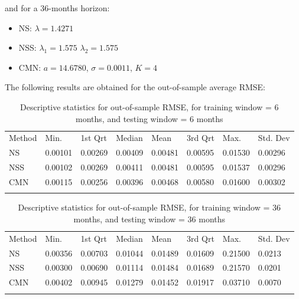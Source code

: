 and for a 36-months horizon: 
\begin{itemize}
\item NS: $\lambda = 1.4271$  
\item NSS: $\lambda_1 = 1.575$ $\lambda_2 = 1.575$
\item CMN: $a = 14.6780$, $\sigma = 0.0011$, $K = 4$
\end{itemize}

\medskip

The following results are obtained for the out-of-sample average RMSE: 

\begin{table}[!htb]
\begin{center}
\caption{Descriptive statistics for out-of-sample RMSE, for training window = 6 months, and testing window = 6 months}
\label{tab:freddatatables3}       %
\begin{tabular}{llllllll}
\hline\noalign{\smallskip}
Method & Min. & 1st Qrt & Median & Mean & 3rd Qrt & Max. & Std. Dev\\
\noalign{\smallskip}\hline\noalign{\smallskip}
  NS   & 0.00101  & 0.00269  & 0.00409  & 0.00481  & 0.00595  & 0.01530 & 0.00296\\
  NSS  & 0.00102  & 0.00269  & 0.00411  & 0.00481  & 0.00595  & 0.01537 & 0.00296\\
  CMN  & 0.00115  & 0.00256  & 0.00396  & 0.00468  & 0.00580  & 0.01600 & 0.00302\\
\noalign{\smallskip}\hline
\end{tabular}
\end{center}
\end{table}

\begin{table}[!htb]
\begin{center}
\caption{Descriptive statistics for out-of-sample RMSE, for training window = 36 months, and testing window = 36 months}
\label{tab:freddatatables4}       %
\begin{tabular}{llllllll}
\hline\noalign{\smallskip}
Method & Min. & 1st Qrt & Median & Mean & 3rd Qrt & Max. & Std. Dev\\
\noalign{\smallskip}\hline\noalign{\smallskip}
  NS   & 0.00356  & 0.00703  & 0.01044  & 0.01489  & 0.01609  & 0.21500 & 0.0213\\
  NSS  & 0.00300  & 0.00690  & 0.01114  & 0.01484  & 0.01689  & 0.21570 & 0.0201\\
  CMN  & 0.00402  & 0.00945  & 0.01279  & 0.01452  & 0.01917  & 0.03710 & 0.0070\\
\noalign{\smallskip}\hline
\end{tabular}
\end{center}
\end{table}

